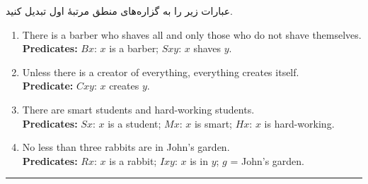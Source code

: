 \documentclass[a4paper,10pt]{article}
\begin{document}
عبارات زیر را به گزاره‌های منطق مرتبهٔ اول تبدیل کنید.
\begin{latin}
\begin{enumerate}

\item 
There is a barber who shaves all and only those who do not shave themselves.\\
\textbf{Predicates:} $Bx$: $x$ is a barber;\; $Sxy$: $x$ shaves $y$.

\item 
Unless there is a creator of everything, everything creates itself.\\
\textbf{Predicate:} $Cxy$: $x$ creates $y$.

\item 
There are smart students and hard-working students.\\
\textbf{Predicates:} $Sx$: $x$ is a student;\; $Mx$: $x$ is smart;\; $Hx$: $x$ is hard-working.

\item 
No less than three rabbits are in John’s garden.\\
\textbf{Predicates:} $Rx$: $x$ is a rabbit;\; $Ixy$: $x$ is in $y$;\; $g$ = John’s garden.


\end{enumerate}
\end{latin}

\bigskip
\bigskip
\rule{\linewidth}{0.4pt}

\end{document}
